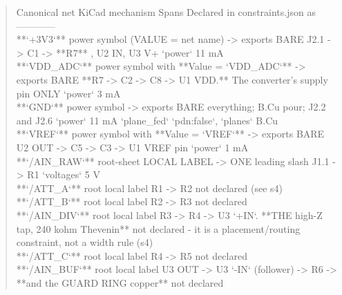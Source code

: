 \documentclass[11pt,a4paper]{article}
\begin{document}
\begin{quote}\small\ttfamily\raggedright
\textbar{} Canonical net \textbar{} KiCad mechanism \textbar{} Spans \textbar{} Declared in constraints.json as \textbar{}\\
\textbar{}---\textbar{}---\textbar{}---\textbar{}---\textbar{}\\
\textbar{} {*}{*}`+3V3`{*}{*} \textbar{} power symbol (VALUE = net name) -\textgreater{} exports BARE \textbar{} J2.1 -\textgreater{} C1 -\textgreater{} {*}{*}R7{*}{*} , U2 IN, U3 V+ \textbar{} `power` 11 mA \textbar{}\\
\textbar{} {*}{*}`VDD\_ADC`{*}{*} \textbar{} power symbol with {*}{*}Value = `VDD\_ADC`{*}{*} -\textgreater{} exports BARE \textbar{} {*}{*}R7 -\textgreater{} C2 -\textgreater{} C8 -\textgreater{} U1 VDD.{*}{*} The converter's supply pin ONLY \textbar{} `power` 3 mA \textbar{}\\
\textbar{} {*}{*}`GND`{*}{*} \textbar{} power symbol -\textgreater{} exports BARE \textbar{} everything; B.Cu pour; J2.2 and J2.6 \textbar{} `power` 11 mA `plane\_fed` `pdn:false`, `planes` B.Cu \textbar{}\\
\textbar{} {*}{*}`VREF`{*}{*} \textbar{} power symbol with {*}{*}Value = `VREF`{*}{*} -\textgreater{} exports BARE \textbar{} U2 OUT -\textgreater{} C5 -\textgreater{} C3 -\textgreater{} U1 VREF pin \textbar{} `power` 1 mA \textbar{}\\
\textbar{} {*}{*}`/AIN\_RAW`{*}{*} \textbar{} root-sheet LOCAL LABEL -\textgreater{} ONE leading slash \textbar{} J1.1 -\textgreater{} R1 \textbar{} `voltages` 5 V \textbar{}\\
\textbar{} {*}{*}`/ATT\_A`{*}{*} \textbar{} root local label \textbar{} R1 -\textgreater{} R2 \textbar{} not declared (see s4) \textbar{}\\
\textbar{} {*}{*}`/ATT\_B`{*}{*} \textbar{} root local label \textbar{} R2 -\textgreater{} R3 \textbar{} not declared \textbar{}\\
\textbar{} {*}{*}`/AIN\_DIV`{*}{*} \textbar{} root local label \textbar{} R3 -\textgreater{} R4 -\textgreater{} U3 `+IN`. {*}{*}THE high-Z tap, 240 kohm Thevenin{*}{*} \textbar{} not declared - it is a placement/routing constraint, not a width rule (s4) \textbar{}\\
\textbar{} {*}{*}`/ATT\_C`{*}{*} \textbar{} root local label \textbar{} R4 -\textgreater{} R5 \textbar{} not declared \textbar{}\\
\textbar{} {*}{*}`/AIN\_BUF`{*}{*} \textbar{} root local label \textbar{} U3 OUT -\textgreater{} U3 `-IN` (follower) -\textgreater{} R6 -\textgreater{} {*}{*}and the GUARD RING copper{*}{*} \textbar{} not declared \textbar{}\\

\end{quote}
\end{document}
